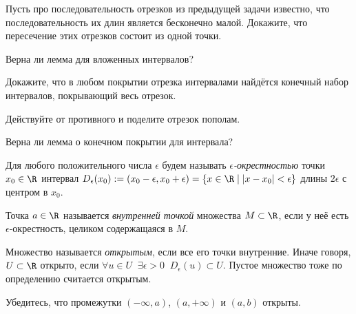 \documentclass[a4paper, 12pt, num=2729, date=01.09.2020]{listok}
\begin{document}
\begin{problem}\label{subsec}
    Пусть про последовательность отрезков из предыдущей задачи известно,
    что последовательность их длин является бесконечно малой.
    Докажите, что пересечение этих отрезков состоит из одной точки.
\end{problem}

\begin{problem}
    Верна ли лемма для вложенных интервалов? 
\end{problem}

\begin{problem}\label{coversec}
    Докажите, что в любом покрытии отрезка интервалами найдётся конечный набор интервалов, покрывающий весь отрезок. \\
\end{problem}
\begin{note}
    Действуйте от противного и поделите отрезок пополам.
\end{note}

\begin{problem}
    Верна ли лемма о конечном покрытии для интервала? 
\end{problem}

\begin{definition}
    Для любого положительного числа $\epsilon$ будем называть \textit{$\epsilon$-окрестностью} точки $x_0 \in \R$ интервал
    $
        D_{\epsilon}(x_0) := \left ( x_0 - \epsilon, x_0 + \epsilon \right )
        = \left \{ x \in \R \mid |x - x_0| < \epsilon \right \}
    $
    длины $2 \epsilon$ с центром в $x_0$.
\end{definition}

\begin{definition}
    Точка $a \in \R$ называется \textit{внутренней точкой} множества $M \subset \R$, если у неё есть $\epsilon$-окрестность, целиком содержащаяся в $M$.
\end{definition}

\begin{definition}
    Множество называется \textit{открытым}, если все его точки внутренние. Иначе говоря, $U \subset \R$ открыто, если
    $\forall{u \in U} \;\; \exists{\epsilon > 0} \;\; D_{\epsilon}(u) \subset U$.
    Пустое множество тоже по определению считается открытым.
\end{definition}

\begin{problem}
    Убедитесь, что промежутки $(-\infty, a)$, $(a, +\infty)$ и $(a, b)$ открыты.
\end{problem}
\end{document}
